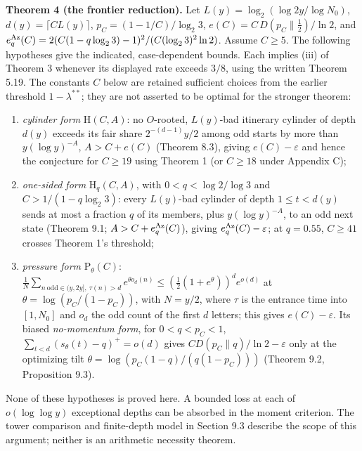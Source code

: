 \documentclass[11pt,a4paper]{article}
\begin{document}
\textbf{Theorem 4 (the frontier reduction).} Let
\(L(y)=\log_2(\log 2y/\log N_0)\), \(d(y)=\lceil CL(y)\rceil\),
\(p_C=(1-1/C)/\log_2 3\), \(e(C)=C\,D(p_C\|\tfrac12)/\ln 2\), and
\(e_q^{\rm Az}(C)=2(C(1-q\log_2 3)-1)^2/
(C(\log_2 3)^2\ln2)\). Assume \(C\ge5\). The following hypotheses give
the indicated, case-dependent bounds. Each implies (iii) of Theorem 3
whenever its displayed rate exceeds \(3/8\), using the written Theorem
5.19. The constants \(C\) below are retained sufficient choices from the
earlier threshold \(1-\lambda^{**}\); they are not asserted to be
optimal for the stronger theorem:

\begin{enumerate}
\def\labelenumi{(\alph{enumi})}
\item
  \emph{cylinder form} \(\mathrm H(C,A)\): no \(O\)-rooted, \(L(y)\)-bad
  itinerary cylinder of depth \(d(y)\) exceeds its fair share
  \(2^{-(d-1)}y/2\) among odd starts by more than \(y(\log y)^{-A}\),
  \(A>C+e(C)\) (Theorem 8.3), giving \(e(C)-\varepsilon\) and hence the
  conjecture for \(C\ge19\) using Theorem 1 (or \(C\ge18\) under
  Appendix C);
\item
  \emph{one-sided form} \(\mathrm H_q(C,A)\), with \(0<q<\log 2/\log 3\)
  and \(C>1/(1-q\log_2 3)\): every \(L(y)\)-bad cylinder of depth
  \(1\le t<d(y)\) sends at most a fraction \(q\) of its members, plus
  \(y(\log y)^{-A}\), to an odd next state (Theorem 9.1;
  \(A>C+e_q^{\rm Az}(C)\)), giving \(e_q^{\rm Az}(C)-\varepsilon\); at
  \(q=0.55\), \(C\ge41\) crosses Theorem 1's threshold;
\item
  \emph{pressure form} \(\mathrm P_\theta(C)\):
  \(\frac1N\sum_{n\ \mathrm{odd}\in(y,2y],\ \tau(n)>d}e^{\theta o_d(n)}\le(\tfrac12(1+e^{\theta}))^{d}e^{o(d)}\)
  at \(\theta=\log(p_C/(1-p_C))\), with \(N=y/2\), where \(\tau\) is the
  entrance time into \([1,N_0]\) and \(o_d\) the odd count of the first
  \(d\) letters; this gives \(e(C)-\varepsilon\). Its biased
  \emph{no-momentum form}, for \(0<q<p_C<1\),
  \(\sum_{t<d}(s_\theta(t)-q)^+=o(d)\) gives
  \(C D(p_C\|q)/\ln2-\varepsilon\) only at the optimizing tilt
  \(\theta=\log(p_C(1-q)/(q(1-p_C)))\) (Theorem 9.2, Proposition 9.3).
\end{enumerate}

None of these hypotheses is proved here. A bounded loss at each of
\(o(\log\log y)\) exceptional depths can be absorbed in the moment
criterion. The tower comparison and finite-depth model in Section 9.3
describe the scope of this argument; neither is an arithmetic necessity
theorem.
\end{document}
